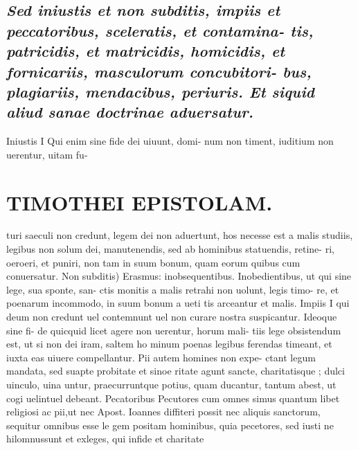 \documentclass{article}
\begin{document}
\begin{pages}
\subsection*{\textit{Sed iniustis et non subditis, impiis et peccatoribus, sceleratis, et contamina- tis, patricidis, et matricidis, homicidis, et fornicariis, masculorum concubitori- bus, plagiariis, mendacibus, periuris. Et siquid aliud sanae doctrinae aduersatur. }}\pstart Iniustis I Qui enim sine fide dei uiuunt, domi- num non timent, iuditium non uerentur, uitam fu-  \pend
\section*{TIMOTHEI EPISTOLAM. }
\marginpar{[ p.19 ]}\pstart turi saeculi non credunt, legem dei non aduertunt, hos necesse est a malis studiis, legibus non solum dei, manutenendis, sed ab hominibus statuendis, retine- ri, oeroeri, et puniri, non tam in suum bonum, quam eorum quibus cum conuersatur.  \pend\pstart Non subditis) Erasmus: inobsequentibus.  \pend\pstart Inobedientibus, ut qui sine lege, sua sponte, san- ctis monitis a malis retrahi non uolunt, legis timo- re, et poenarum incommodo, in suum bonum a ueti tis arceantur et malis.  \pend\pstart Impiis I qui deum non credunt uel contemnunt uel non curare nostra suspicantur. Ideoque sine fi- de quicquid licet agere non uerentur, horum mali- tiis lege obsistendum est, ut si non dei iram, saltem ho minum poenas legibus ferendas timeant, et iuxta eas uiuere compellantur. Pii autem homines non expe- ctant legum mandata, sed suapte probitate et sinoe ritate agunt sancte, charitatisque ; dulci uinculo, uina untur, praecurruntque potius, quam ducantur, tantum abest, ut cogi uelintuel debeant.  \pend\pstart Pecatoribus Pecutores cum omnes simus quantum libet religiosi ac pii,ut nec Apost. Ioannes diffiteri possit nec aliquis sanctorum, sequitur omnibus esse le gem positam hominibus, quia pecetores, sed iusti ne hilomnussunt et exleges, qui infide et charitate  \pend

\end{pages}
\end{document}
